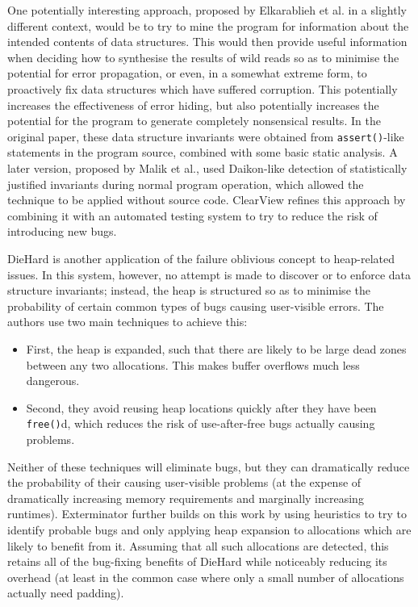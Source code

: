One potentially interesting approach, proposed by Elkarablieh et
al.\cite{Elkarablieh2007} in a slightly different context, would be to
try to mine the program for information about the intended contents of
data structures.  This would then provide useful information when
deciding how to synthesise the results of wild reads so as to minimise
the potential for error propagation, or even, in a somewhat extreme
form, to proactively fix data structures which have suffered
corruption.  This potentially increases the effectiveness of error
hiding, but also potentially increases the potential for the program
to generate completely nonsensical results.  In the original paper,
these data structure invariants were obtained from
\verb|assert()|-like statements in the program source, combined with
some basic static analysis.  A later version, proposed by Malik et
al.\cite{Malik}, used Daikon-like detection of statistically justified
invariants during normal program operation, which allowed the
technique to be applied without source code.  ClearView\cite{Perkins}
refines this approach by combining it with an automated testing system
to try to reduce the risk of introducing new bugs.

DieHard\cite{Berger2006} is another application of the failure
oblivious concept to heap-related issues.  In this system, however, no
attempt is made to discover or to enforce data structure invariants;
instead, the heap is structured so as to minimise the probability of
certain common types of bugs causing user-visible errors.  The authors
use two main techniques to achieve this:
\begin{itemize}
\item First, the heap is expanded, such that there are likely to be
  large dead zones between any two allocations.  This makes buffer
  overflows much less dangerous.
\item Second, they avoid reusing heap locations quickly after they
  have been \texttt{free()}d, which reduces the risk of use-after-free
  bugs actually causing problems.
\end{itemize}
Neither of these techniques will eliminate bugs, but they can
dramatically reduce the probability of their causing user-visible
problems (at the expense of dramatically increasing memory
requirements and marginally increasing runtimes).
Exterminator\cite{Novark2007} further builds on this work by using
heuristics to try to identify probable bugs and only applying heap
expansion to allocations which are likely to benefit from it.
Assuming that all such allocations are detected, this retains all of
the bug-fixing benefits of DieHard while noticeably reducing its
overhead (at least in the common case where only a small number of
allocations actually need padding).

